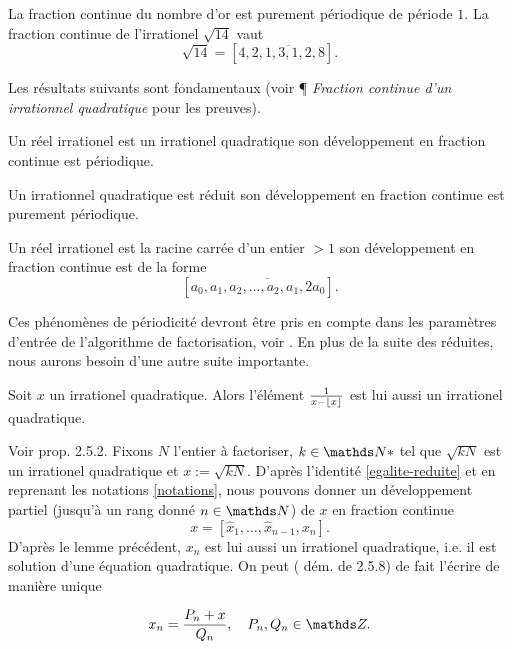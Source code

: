 \begin{exemple}
	La fraction continue du nombre d'or est purement périodique de période $1$.
	La fraction continue de l'irrationel $\sqrt{14}$ vaut \[\sqrt{14} = [4,
	\overline{2, 1, 3, 1, 2, 8}].\]
\end{exemple}

Les résultats suivants sont fondamentaux (voir \cite{wikiu} ¶ \emph{Fraction
continue d'un irrationnel quadratique} pour les preuves).

\begin{theoreme}[Lagrange, 1770]
	Un réel irrationel est un irrationel quadratique \ssi son développement en
	fraction continue est périodique.
\end{theoreme}

\begin{theoreme}[Galois, 1829]
	Un irrationnel quadratique est réduit \ssi son développement en fraction
	continue est purement périodique.
\end{theoreme}

\begin{theoreme}[Legendre, 1798]
	Un réel irrationel est la racine carrée d'un entier $>1$ \ssi son
	développement en fraction continue est de la forme \[[a_0, \overline{a_1,
	a_2, \dots, a_2, a_1, 2a_0}].\]
\end{theoreme}

Ces phénomènes de périodicité devront être pris en compte dans les paramètres
d'entrée de l'algorithme de factorisation, voir . En plus de la suite
des réduites, nous aurons besoin d'une autre suite importante.

\begin{lemme}
	Soit $x$ un irrationel quadratique. Alors l'élément $\frac{1}{x - \lfloor x\rfloor}$
	est lui aussi un irrationel quadratique.
\end{lemme}

Voir \cite{Lauritzen} prop. 2.5.2. Fixons $N$ l'entier à factoriser, $k\in \N*$
tel que $\sqrt{kN}$ est un irrationel quadratique et $x := \sqrt{kN}$. D'après
l'identité \ref{egalite-reduite} et en reprenant les notations \ref{notations},
nous pouvons donner un développement partiel (jusqu'à un rang donné $n\in \N$)
de $x$ en fraction continue \[x = [\hat{x}_1, \dots, \hat{x}_{n-1}, x_n].\]
D'après le lemme précédent, $x_n$ est lui aussi un irrationel quadratique, i.e.
il est solution d'une équation quadratique. On peut (\cite{Lauritzen} dém. de
2.5.8) de fait l'écrire de manière unique 

\begin{equation}
	x_n = \frac{P_n + x}{Q_n}, \quad P_n, Q_n \in \Z.
\end{equation}

